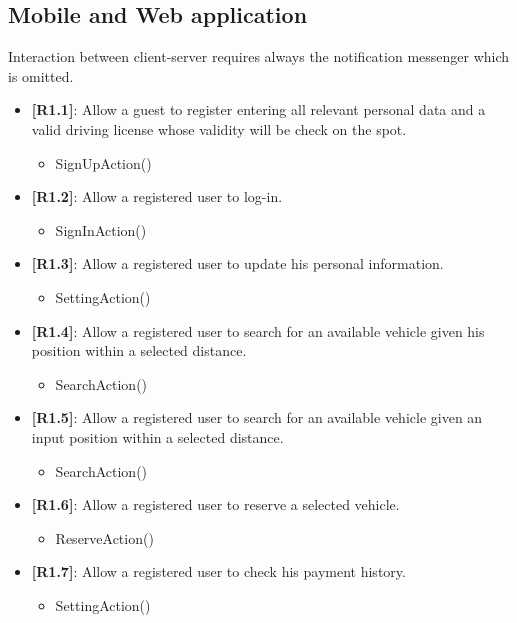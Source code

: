 \subsection{Mobile and Web application}
Interaction between client-server requires always the notification messenger which is omitted.\\
\begin{itemize}
	\item{\textbf{[R1.1]}}: Allow a guest to register entering all relevant personal data and a valid driving license whose validity will be check on the spot.
	\begin{itemize}
	\item SignUpAction()
	\end{itemize}
	\item{\textbf{[R1.2]}}: Allow a registered user to log-in.
	\begin{itemize}
	\item SignInAction()
	\end{itemize}
	\item{\textbf{[R1.3]}}: Allow a registered user to update his personal information.
	\begin{itemize}
	\item SettingAction()
	\end{itemize}
	\item{\textbf{[R1.4]}}: Allow a registered user to search for an available vehicle given his position within a selected distance.
	\begin{itemize}
	\item SearchAction()
	\end{itemize}
	\item{\textbf{[R1.5]}}: Allow a registered user to search for an available vehicle given an input position within a selected distance.
	\begin{itemize}
	\item SearchAction()
	\end{itemize}
	\item{\textbf{[R1.6]}}: Allow a registered user to reserve a selected vehicle.
	\begin{itemize}
	\item ReserveAction()
	\end{itemize}
	\item{\textbf{[R1.7]}}: Allow a registered user to check his payment history.
	\begin{itemize}
	\item SettingAction()
	\end{itemize}

\end{itemize}
